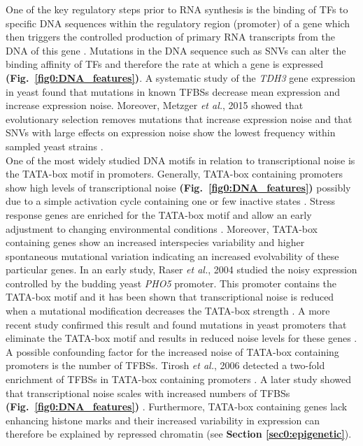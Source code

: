 One of the key regulatory steps prior to RNA synthesis is the binding of \glspl{TF} to specific DNA sequences within the regulatory region (promoter) of a gene which then triggers the controlled production of primary RNA transcripts from the DNA of this gene \citep{Latchman1993}. Mutations in the DNA sequence such as \glspl{SNV} can alter the binding affinity of TFs and therefore the rate at which a gene is expressed \textbf{(Fig.~\ref{fig0:DNA_features})}. A systematic study of the \textit{\gls{TDH3}} gene expression in yeast found that mutations in known \glspl{TFBS} decrease mean expression and increase expression noise. Moreover, Metzger \textit{et al.}, 2015 showed that evolutionary selection removes mutations that increase expression noise and that SNVs with large effects on expression noise show the lowest frequency within sampled yeast strains \citep{Metzger2015}. \\

One of the most widely studied DNA motifs in relation to transcriptional noise is the TATA-box motif in promoters. Generally, TATA-box containing promoters show high levels of transcriptional noise \textbf{(Fig.~\ref{fig0:DNA_features})} \citep{Faure2017} possibly due to a simple activation cycle containing one or few inactive states \citep{Zoller2015}. Stress response genes are enriched for the TATA-box motif and allow an early adjustment to changing environmental conditions \citep{Lopez-Maury2009}. Moreover, TATA-box containing genes show an increased interspecies variability \citep{Tirosh2006} and higher spontaneous mutational variation \citep{Landry2007} indicating an increased evolvability of these particular genes. In an early study, Raser \textit{et al.}, 2004 studied the noisy expression controlled by the budding yeast \textit{\gls{PHO5}} promoter. This promoter contains the TATA-box motif and it has been shown that transcriptional noise is reduced when a mutational modification decreases the TATA-box strength \citep{Raser2004}. A more recent study confirmed this result and found mutations in yeast promoters that eliminate the TATA-box motif and results in reduced noise levels for these genes \citep{Hornung2012}. \\

A possible confounding factor for the increased noise of TATA-box containing promoters is the number of TFBSs. Tirosh \textit{et al.}, 2006 detected a two-fold enrichment of TFBSs in TATA-box containing promoters \citep{Tirosh2006}. A later study showed that transcriptional noise scales with increased numbers of TFBSs \textbf{(Fig.~\ref{fig0:DNA_features})} \citep{Sharon2014}. Furthermore, TATA-box containing genes lack enhancing histone marks and their increased variability in expression can therefore be explained by repressed chromatin \citep{Choi2008} (see \textbf{Section \ref{sec0:epigenetic}}).  

